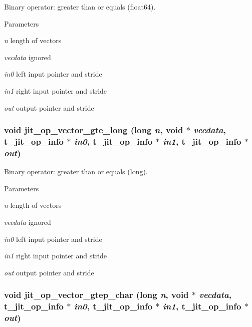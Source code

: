 Binary operator: greater than or equals (float64). 
\begin{DoxyParams}{Parameters}
\item[{\em n}]length of vectors \item[{\em vecdata}]ignored \item[{\em in0}]left input pointer and stride \item[{\em in1}]right input pointer and stride \item[{\em out}]output pointer and stride \end{DoxyParams}
\hypertarget{group__opvecmod_gaf294824ff96797d4145a59b56d2bfaee}{
\subsubsection[{jit\_\-op\_\-vector\_\-gte\_\-long}]{\setlength{\rightskip}{0pt plus 5cm}void jit\_\-op\_\-vector\_\-gte\_\-long (long {\em n}, \/  void $\ast$ {\em vecdata}, \/  {\bf t\_\-jit\_\-op\_\-info} $\ast$ {\em in0}, \/  {\bf t\_\-jit\_\-op\_\-info} $\ast$ {\em in1}, \/  {\bf t\_\-jit\_\-op\_\-info} $\ast$ {\em out})}}
\label{group__opvecmod_gaf294824ff96797d4145a59b56d2bfaee}


Binary operator: greater than or equals (long). 
\begin{DoxyParams}{Parameters}
\item[{\em n}]length of vectors \item[{\em vecdata}]ignored \item[{\em in0}]left input pointer and stride \item[{\em in1}]right input pointer and stride \item[{\em out}]output pointer and stride \end{DoxyParams}
\hypertarget{group__opvecmod_ga2cf7bbc7506303fbe7b33fb6325ba5be}{
\subsubsection[{jit\_\-op\_\-vector\_\-gtep\_\-char}]{\setlength{\rightskip}{0pt plus 5cm}void jit\_\-op\_\-vector\_\-gtep\_\-char (long {\em n}, \/  void $\ast$ {\em vecdata}, \/  {\bf t\_\-jit\_\-op\_\-info} $\ast$ {\em in0}, \/  {\bf t\_\-jit\_\-op\_\-info} $\ast$ {\em in1}, \/  {\bf t\_\-jit\_\-op\_\-info} $\ast$ {\em out})}}
\label{group__opvecmod_ga2cf7bbc7506303fbe7b33fb6325ba5be}


